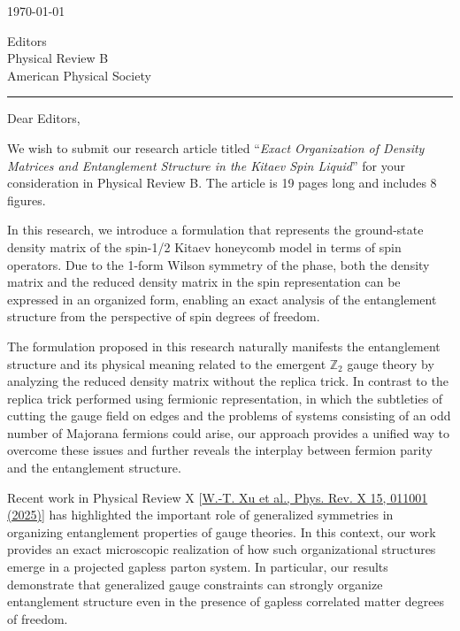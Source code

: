 \documentclass[12pt]{article}
\begin{document}
\fontsize{12pt}{14pt}\selectfont

\begin{flushright}
    \today
\end{flushright}
\begin{flushleft}
Editors
\\
Physical Review B
\\
American Physical Society
\end{flushleft}
\vspace{-5mm}

\noindent\rule{\linewidth}{1.2pt}

\vspace{5mm}
\fontsize{12pt}{18pt}\selectfont
\noindent Dear Editors,

\bigskip

We wish to submit our research article titled ``\textit{Exact Organization of Density Matrices and Entanglement Structure in the Kitaev Spin Liquid}'' for your consideration in Physical Review B. The article is 19 pages long and includes 8 figures. 

In this research, we introduce a formulation that represents the ground-state density matrix of the spin-1/2 Kitaev honeycomb model in terms of spin operators. Due to the 1-form Wilson symmetry of the phase, both the density matrix and the reduced density matrix in the spin representation can be expressed in an organized form, enabling an exact analysis of the entanglement structure from the perspective of spin degrees of freedom.

The formulation proposed in this research naturally manifests the entanglement structure and its physical meaning related to the emergent $\mathbb{Z}_2$ gauge theory by analyzing the reduced density matrix without the replica trick. In contrast to the replica trick performed using fermionic representation, in which the subtleties of cutting the gauge field on edges and the problems of systems consisting of an odd number of Majorana fermions could arise, our approach provides a unified way to overcome these issues and further reveals the interplay between fermion parity and the entanglement structure.

Recent work in Physical Review X [\href{https://doi.org/10.1103/PhysRevX.15.011001}{W.-T. Xu et al., Phys. Rev. X 15, 011001 (2025)}] has highlighted the important role of generalized symmetries in organizing entanglement properties of gauge theories. 
%
In this context, our work provides an exact microscopic realization of how such organizational structures emerge in a projected gapless parton system. 
%
In particular, our results demonstrate that generalized gauge constraints can strongly organize entanglement structure even in the presence of gapless correlated matter degrees of freedom.
\end{document}
